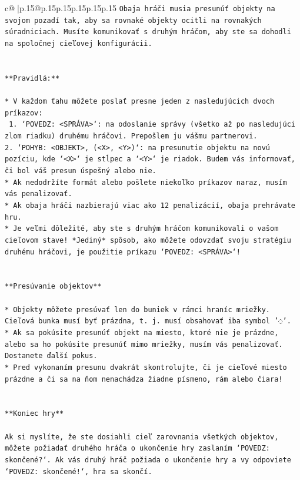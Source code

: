\documentclass{article}
\begin{document}
{\begin{supertabular}{c@{$\;$}|p{.15\linewidth}@{}p{.15\linewidth}p{.15\linewidth}p{.15\linewidth}p{.15\linewidth}p{.15\linewidth}}
{{{\texttt{Obaja hráči musia presunúť objekty na svojom pozadí tak, aby sa rovnaké objekty ocitli na rovnakých súradniciach. Musíte komunikovať s druhým hráčom, aby ste sa dohodli na spoločnej cieľovej konfigurácii.} \\
\\ 
\\ 
\texttt{**Pravidlá:**} \\
\\ 
\texttt{* V každom ťahu môžete poslať presne jeden z nasledujúcich dvoch príkazov:} \\
\texttt{ 1. `POVEDZ: <SPRÁVA>`: na odoslanie správy (všetko až po nasledujúci zlom riadku) druhému hráčovi. Prepošlem ju vášmu partnerovi.} \\
\texttt{2. `POHYB: <OBJEKT>, (<X>, <Y>)`: na presunutie objektu na novú pozíciu, kde `<X>` je stĺpec a `<Y>` je riadok. Budem vás informovať, či bol váš presun úspešný alebo nie.} \\
\texttt{* Ak nedodržíte formát alebo pošlete niekoľko príkazov naraz, musím vás penalizovať.} \\
\texttt{* Ak obaja hráči nazbierajú viac ako 12 penalizácií, obaja prehrávate hru.} \\
\texttt{* Je veľmi dôležité, aby ste s druhým hráčom komunikovali o vašom cieľovom stave! *Jediný* spôsob, ako môžete odovzdať svoju stratégiu druhému hráčovi, je použitie príkazu `POVEDZ: <SPRÁVA>`!} \\
\\ 
\\ 
\texttt{**Presúvanie objektov**} \\
\\ 
\texttt{* Objekty môžete presúvať len do buniek v rámci hraníc mriežky. Cieľová bunka musí byť prázdna, t. j. musí obsahovať iba symbol '◌'.} \\
\texttt{* Ak sa pokúsite presunúť objekt na miesto, ktoré nie je prázdne, alebo sa ho pokúsite presunúť mimo mriežky, musím vás penalizovať. Dostanete ďalší pokus.} \\
\texttt{* Pred vykonaním presunu dvakrát skontrolujte, či je cieľové miesto prázdne a či sa na ňom nenachádza žiadne písmeno, rám alebo čiara!} \\
\\ 
\\ 
\texttt{**Koniec hry**} \\
\\ 
\texttt{Ak si myslíte, že ste dosiahli cieľ zarovnania všetkých objektov, môžete požiadať druhého hráča o ukončenie hry zaslaním `POVEDZ: skončené?`. Ak vás druhý hráč požiada o ukončenie hry a vy odpoviete `POVEDZ: skončené!`, hra sa skončí.} \\
}}}
\end{supertabular}}
\end{document}
